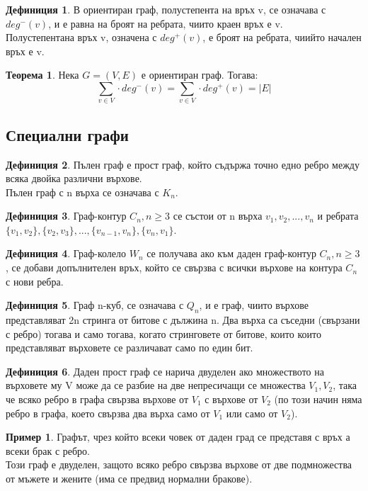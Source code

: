 \documentclass[fleqn, 12pt]{article}
\theoremstyle{definition}
\newtheorem{example}{Пример}[subsection]
\newtheorem{definition}{Дефиниция}[subsection]
\newtheorem{theorem}{Теорема}[subsection]
\begin{document}
\begin{definition}
В ориентиран граф, полустепента на връх v, се означава с $deg^- (v)$, и е равна на броят на ребрата, чиито краен връх е v.\\
Полустепентана връх v, означена с $deg^+ (v)$, е броят на ребрата, чиийто начален връх е v. 
\end{definition}

\begin{theorem}
Нека $G = (V, E)$ е ориентиран граф. Тогава: 
$$\sum_{v \in V} \cdot deg^- (v) = \sum_{v \in V} \cdot deg^+ (v) = \vert E \vert$$
\end{theorem}

\subsection{Специални графи}
\begin{definition}
Пълен граф е прост граф, който съдържа точно едно ребро между всяка двойка различни върхове.\\
Пълен граф с n върха се означава с $K_n$.
\end{definition}
\begin{definition}
Граф-контур $C_n, n \geq 3$ се състои от n върха $v_1, v_2, ..., v_n$ и ребрата $\{v_1, v_2\}, \{v_2, v_3\}, ..., \{v_{n-1}, v_n\}, \{v_n, v_1\}$.
\end{definition}
\begin{definition}
Граф-колело $W_n$ се получава ако към даден граф-контур $C_n, n \geq 3$, се добави допълнителен връх, който се свързва с всички върхове на контура $C_n$ с нови ребра. 
\end{definition}
\begin{definition}
Граф n-куб, се означава с $Q_n$, и е граф, чиито върхове представляват 2n стринга от битове с дължина n. Два върха са съседни (свързани с ребро) тогава и само тогава, когато стринговете от битове, които които представляват върховете се различават само по един бит.
\end{definition}
\begin{definition}
Даден прост граф се нарича двуделен ако множеството на върховете му V може да се разбие на две непресичащи се множества $V_1,V_2$, така че всяко ребро в графа свързва върхове от $V_1$ с върхове от $V_2$ (по този начин няма ребро в графа, което свързва два върха само от $V_1$ или само от $V_2$).
\end{definition}
\begin{example}
Графът, чрез който всеки човек от даден град се представя с връх а всеки брак с ребро. \\
Този граф е двуделен, защото всяко ребро свързва върхове от две подмножества от мъжете и жените (има се предвид нормални бракове).
\end{example}
\end{document}
